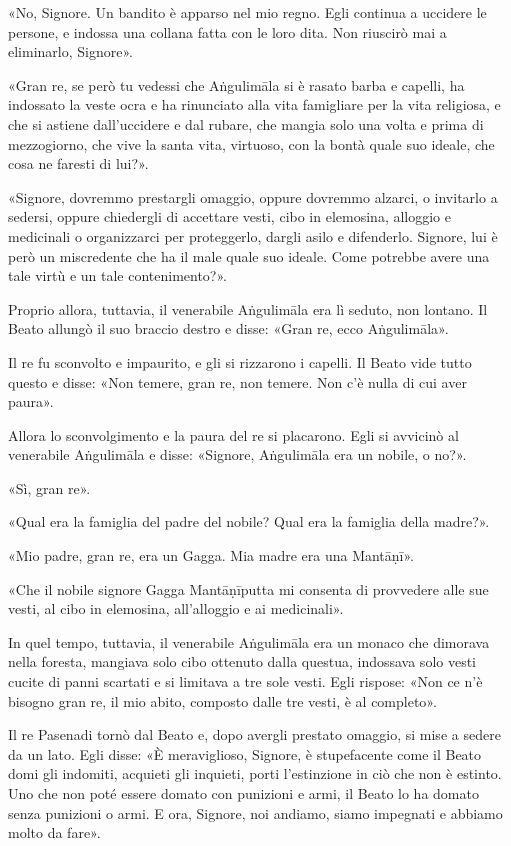 «No, Signore. Un bandito è apparso nel mio regno. Egli continua a
uccidere le persone, e indossa una collana fatta con le loro dita. Non
riuscirò mai a eliminarlo, Signore».


«Gran re, se però tu vedessi che Aṅgulimāla si è rasato barba e capelli,
ha indossato la veste ocra e ha rinunciato alla vita famigliare per la
vita religiosa, e che si astiene dall’uccidere e dal rubare, che mangia
solo una volta e prima di mezzogiorno, che vive la santa vita, virtuoso,
con la bontà quale suo ideale, che cosa ne faresti di lui?».


«Signore, dovremmo prestargli omaggio, oppure dovremmo alzarci, o
invitarlo a sedersi, oppure chiedergli di accettare vesti, cibo in
elemosina, alloggio e medicinali o organizzarci per proteggerlo, dargli
asilo e difenderlo. Signore, lui è però un miscredente che ha il male
quale suo ideale. Come potrebbe avere una tale virtù e un tale
contenimento?».


Proprio allora, tuttavia, il venerabile Aṅgulimāla era lì seduto, non
lontano. Il Beato allungò il suo braccio destro e disse: «Gran re, ecco
Aṅgulimāla».


Il re fu sconvolto e impaurito, e gli si rizzarono i capelli. Il Beato
vide tutto questo e disse: «Non temere, gran re, non temere. Non c’è
nulla di cui aver paura».


Allora lo sconvolgimento e la paura del re si placarono. Egli si
avvicinò al venerabile Aṅgulimāla e disse: «Signore, Aṅgulimāla era un
nobile, o no?».


«Sì, gran re».


«Qual era la famiglia del padre del nobile? Qual era la famiglia della
madre?».


«Mio padre, gran re, era un Gagga. Mia madre era una Mantāṇī».


«Che il nobile signore Gagga Mantāṇīputta mi consenta di provvedere alle
sue vesti, al cibo in elemosina, all’alloggio e ai medicinali».


In quel tempo, tuttavia, il venerabile Aṅgulimāla era un monaco che
dimorava nella foresta, mangiava solo cibo ottenuto dalla questua,
indossava solo vesti cucite di panni scartati e si limitava a tre sole
vesti. Egli rispose: «Non ce n’è bisogno gran re, il mio abito, composto
dalle tre vesti, è al completo».


Il re Pasenadi tornò dal Beato e, dopo avergli prestato omaggio, si mise
a sedere da un lato. Egli disse: «È meraviglioso, Signore, è
stupefacente come il Beato domi gli indomiti, acquieti gli inquieti,
porti l’estinzione in ciò che non è estinto. Uno che non poté essere
domato con punizioni e armi, il Beato lo ha domato senza punizioni o
armi. E ora, Signore, noi andiamo, siamo impegnati e abbiamo molto da
fare».



